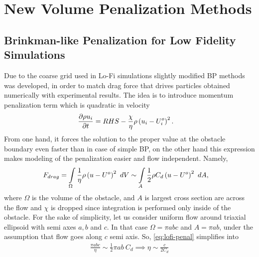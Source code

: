 \chapter{New Volume Penalization Methods}
\label{chapter:3}
\section{Brinkman-like Penalization for Low Fidelity Simulations}
Due to the coarse grid used in Lo-Fi simulations slightly modified BP methods was developed, in order to match drag force that drives particles obtained numerically with experimental results. The idea is to introduce momentum penalization term which is quadratic in velocity
\begin{align}
\frac {\partial \rho u_i}{\partial t} &= RHS - \frac \chi \eta \rho \left(u_i - U_i^o\right)^2.
\end{align}
From one hand, it forces the solution to the proper value at the obstacle boundary even faster than in case of simple BP, on the other hand this expression makes modeling of the penalization easier and flow independent. Namely, 
\begin{align}
F_{drag} &= \int\displaylimits_\Omega \frac 1 \eta \rho \rbr{u - U^o}^2\ dV \sim \int \displaylimits_A \frac 12 \rho C_d \rbr{u - U^o}^2\ dA, \label{eq:lofi-penal}
\end{align}
where $\Omega$ is the volume of the obstacle, and $A$ is largest cross section are across the flow and $\chi$ is dropped since integration is performed only inside of the obstacle. For the sake of simplicity, let us consider uniform flow around triaxial ellipsoid with semi axes $a,b$ and $c$. In that case $\Omega = \pi a b c$ and $A = \pi a b$, under the assumption that flow goes along $c$ semi axis. So, \eqref{eq:lofi-penal} simplifies into
\begin{align}
\frac {\pi a b c}\eta \sim \frac 12 \pi a b\ C_d \implies \eta \sim \frac c{2C_d}
\end{align}

